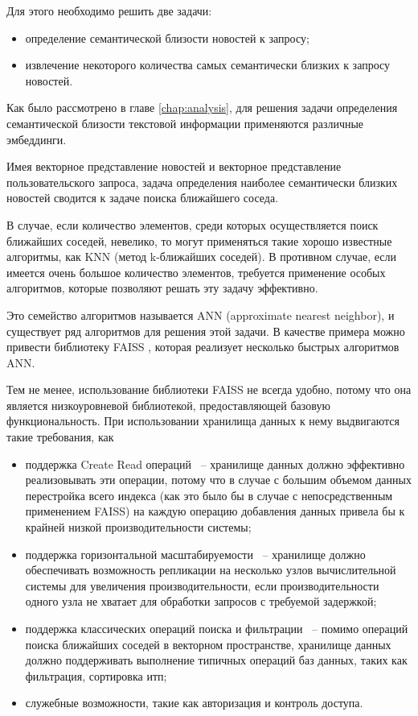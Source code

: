 Для этого необходимо решить две задачи:
\begin{itemize}
    \item определение семантической близости новостей к запросу;
    \item извлечение некоторого количества самых семантически близких к запросу новостей.
\end{itemize}

Как было рассмотрено в главе \ref{chap:analysis}, для решения задачи определения семантической близости текстовой информации применяются различные эмбеддинги.

Имея векторное представление новостей и векторное представление пользовательского запроса, задача определения наиболее семантически близких новостей сводится к задаче поиска ближайшего соседа.

В случае, если количество элементов, среди которых осуществляется поиск ближайших соседей, невелико, то могут применяться такие хорошо известные алгоритмы, как KNN (метод k-ближайших соседей). В противном случае, если имеется очень большое количество элементов, требуется применение особых алгоритмов, которые позволяют решать эту задачу эффективно.

Это семейство алгоритмов называется ANN (approximate nearest neighbor), и существует ряд алгоритмов для решения этой задачи. В качестве примера можно привести библиотеку FAISS \cite{faiss}, которая реализует несколько быстрых алгоритмов ANN.

Тем не менее, использование библиотеки FAISS не всегда удобно, потому что она является низкоуровневой библиотекой, предоставляющей базовую функциональность. При использовании хранилища данных к нему выдвигаются такие требования, как
\begin{itemize}
    \item поддержка Create Read операций ~-- хранилище данных должно эффективно реализовывать эти операции, потому что в случае с большим объемом данных перестройка всего индекса (как это было бы в случае с непосредственным применением FAISS) на каждую операцию добавления данных привела бы к крайней низкой производительности системы;
    \item поддержка горизонтальной масштабируемости ~-- хранилище должно обеспечивать возможность репликации на несколько узлов вычислительной системы для увеличения производительности, если производительности одного узла не хватает для обработки запросов с требуемой задержкой;
    \item поддержка классических операций поиска и фильтрации ~-- помимо операций поиска ближайших соседей в векторном пространстве, хранилище данных должно поддерживать выполнение типичных операций баз данных, таких как фильтрация, сортировка итп;
    \item служебные возможности, такие как авторизация и контроль доступа.
\end{itemize}

